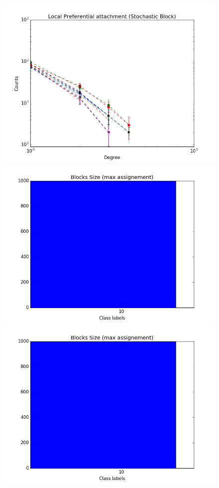 \documentclass[a4paper, 12pt]{article}
\begin{document}
\begin{figure}[ht]
	\endminipage
	\includegraphics[scale=0.27]{img/expe/3_mmsb/figure_2}
	\endminipage
		\vspace{-0.28cm}
	\includegraphics[scale=0.27]{img/expe/1_mmsb/figure_3}
	\endminipage
	\includegraphics[scale=0.27]{img/expe/2_mmsb/figure_3} 

\end{figure}
\end{document}
